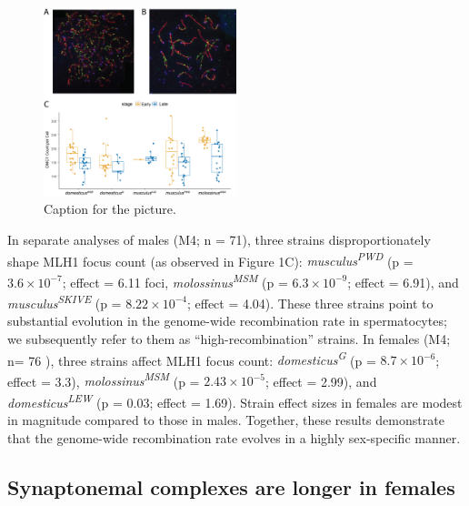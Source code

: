 \documentclass[
]{article}
\begin{document}
\begin{figure}
\centering
\includegraphics[width=0.5\textwidth,height=\textheight]{Figure2.jpg}
\caption{Caption for the picture.}
\end{figure}

In separate analyses of males (M4; n = 71), three strains
disproportionately shape MLH1 focus count (as observed in Figure 1C):
\emph{musculus\textsuperscript{PWD}} (p =
\ensuremath{3.6\times 10^{-7}}; effect = 6.11 foci,
\emph{molossinus\textsuperscript{MSM}} (p =
\ensuremath{6.3\times 10^{-9}}; effect = 6.91), and
\emph{musculus\textsuperscript{SKIVE}} (p =
\ensuremath{8.22\times 10^{-4}}; effect = 4.04). These three strains
point to substantial evolution in the genome-wide recombination rate in
spermatocytes; we subsequently refer to them as ``high-recombination''
strains. In females (M4; n= 76 ), three strains affect MLH1 focus count:
\emph{domesticus\textsuperscript{G}} (p =
\ensuremath{8.7\times 10^{-6}}; effect = 3.3),
\emph{molossinus\textsuperscript{MSM}} (p =
\ensuremath{2.43\times 10^{-5}}; effect = 2.99), and
\emph{domesticus\textsuperscript{LEW}} (p = 0.03; effect = 1.69). Strain
effect sizes in females are modest in magnitude compared to those in
males. Together, these results demonstrate that the genome-wide
recombination rate evolves in a highly sex-specific manner.

\hypertarget{synaptonemal-complexes-are-longer-in-females}{%
\subsection{Synaptonemal complexes are longer in
females}\label{synaptonemal-complexes-are-longer-in-females}}
\end{document}
